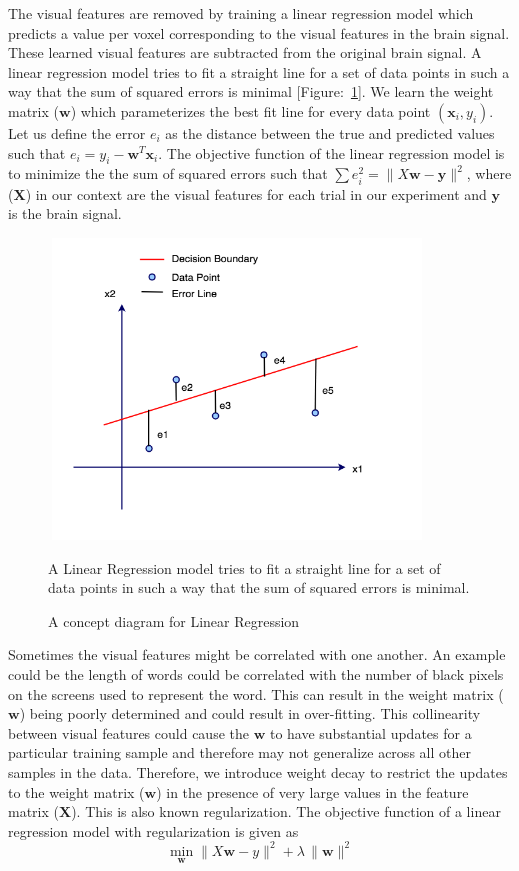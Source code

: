 The visual features are removed by training a linear regression model which predicts a value per voxel corresponding to the visual features in the brain signal. These learned visual features are subtracted from the original brain signal. A linear regression model tries to fit a straight line for a set of data points in such a way that the sum of squared errors is minimal [Figure:~\ref{LinearRegression}].  We learn the weight matrix ($\mathbf w$) which parameterizes the best fit line for every data point $(\mathbf x_i, y_i)$. Let us define the error $e_i$ as the distance between the true and predicted values such that $e_i = y_i - \mathbf w^T \mathbf x_i$. The objective function of the linear regression model is to minimize the the sum of squared errors such that $\sum e_i^2 =  \| X \mathbf w - \mathbf y \|^2$, where ($\mathbf X$)  in our context are the visual features for each trial in our experiment and $\mathbf y$ is the brain signal. 



\begin{figure}[t]
\centering
\includegraphics[width=10cm, height=8cm]{Figures/LinearRegression}
\caption{A concept diagram for Linear Regression}
\label{LinearRegression}
A Linear Regression model tries to fit a straight line for a set of data points in such a way that the sum of squared errors is minimal.
\end{figure}

Sometimes the visual features might be correlated with one another. An example could be the length of words could be correlated with the number of black pixels on the screens used to represent the word. This can result in the weight matrix ($\mathbf w$) being poorly determined and could result in over-fitting. This collinearity between visual features could cause the $\mathbf w$ to have substantial updates for a particular training sample and therefore may not generalize across all other samples in the data. Therefore, we introduce weight decay to restrict the updates to the weight matrix ($\mathbf w$) in the presence of very large values in the feature matrix ($\mathbf X$). This is also known regularization. The objective function of a linear regression model with regularization is given as %
\[\min\limits_{\mathbf w} \| X \mathbf w - y \|^2 + \lambda \, \| \mathbf w \|^2\]

